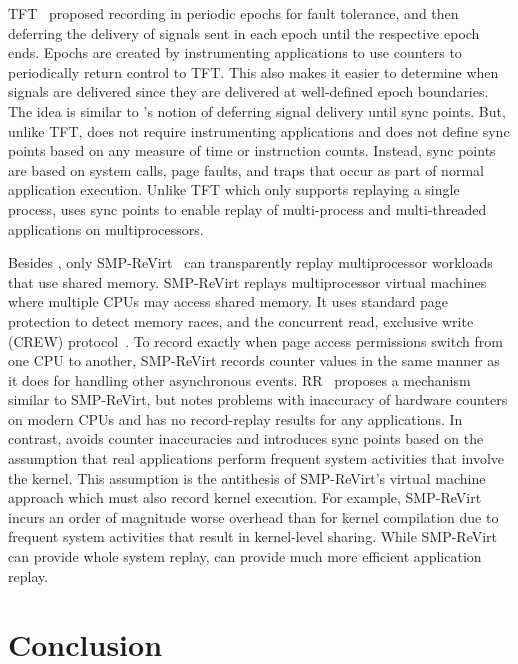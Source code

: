 TFT~\cite{bressoud-tft} proposed recording in periodic epochs for
fault tolerance, and then deferring the delivery of signals 
sent in each epoch until the respective epoch ends.  Epochs are
created by instrumenting applications to use counters to periodically
return control to TFT.  This also makes it easier to determine when
signals are delivered since they are delivered at well-defined epoch
boundaries.  The idea is similar to \scribe{}'s notion of deferring
signal delivery until sync points.  But, unlike TFT, \scribe{}
does not require instrumenting applications and does not define sync
points based on any measure of time or instruction counts.  Instead,
sync points are based on system calls, page faults, and traps that
occur as part of normal application execution.  Unlike TFT which only
supports replaying a single process, \scribe{} uses sync points to
enable replay of multi-process and multi-threaded applications on
multiprocessors. 

Besides \scribe{}, only SMP-ReVirt~\cite{smp-revirt} can transparently
replay multiprocessor workloads that use shared memory.
SMP-ReVirt replays multiprocessor virtual machines where multiple CPUs
may access shared memory.  It uses standard page protection to detect
memory races, and the concurrent read, exclusive write (CREW)
protocol~\cite{crew,instant-replay}.  To record exactly when page
access permissions switch from one CPU to another, SMP-ReVirt records
counter values in the same manner as it does for handling other
asynchronous events.  RR~\cite{rr} proposes a mechanism similar to
SMP-ReVirt, but notes problems with inaccuracy of hardware counters on
modern CPUs and has no record-replay results for any applications.
In contrast, \scribe{} avoids counter inaccuracies and introduces sync
points based on the 
assumption that real
applications perform frequent system activities that involve the
kernel.  This assumption is the antithesis of SMP-ReVirt's virtual
machine approach which must also record kernel execution.
For example, SMP-ReVirt incurs an order of magnitude worse
overhead than \scribe{} for kernel compilation due to frequent system
activities that result in kernel-level sharing.  While SMP-ReVirt can
provide whole system replay, \scribe{} can provide much more efficient
application replay.   

\section{Conclusion}
\label{scribe:sec:conclusion}

